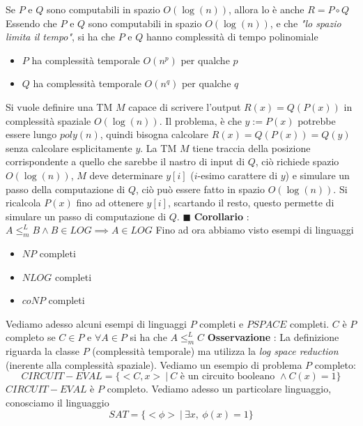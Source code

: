 \documentclass[10pt, letterpaper]{report}
\begin{document}
\teo{} Se $P$ e $Q$ sono computabili in spazio $O(\log(n))$, allora lo è anche $R=P\circ Q$\acc 
\dimo{} Essendo che $P$ e $Q$ sono computabili in spazio $O(\log(n))$, e che \textit{"lo spazio limita il tempo"}, si ha che $P$ e $Q$ hanno complessità di tempo polinomiale\begin{itemize}
    \item $P$ ha complessità temporale $O(n^p)$ per qualche $p$
    \item $Q$ ha complessità temporale $O(n^q)$ per qualche $q$
\end{itemize}
Si vuole definire una TM $M$ capace di scrivere l'output $R(x)=Q(P(x))$ in complessità spaziale $O(\log(n))$.\acc 
Il problema, è che $y:=P(x)$ potrebbe essere lungo $poly(n)$, quindi bisogna calcolare $R(x)=Q(P(x))=Q(y)$ senza calcolare esplicitamente $y$.\acc 
{}\acc 
La TM $M$ tiene traccia della posizione corrispondente a quello che sarebbe il nastro di input di $Q$, ciò richiede spazio $O(\log(n))$, $M$ deve determinare $y[i]$ ($i$-esimo carattere di $y$) e simulare un passo della computazione di $Q$, ciò può essere fatto in spazio $O(\log(n))$. \acc 
Si ricalcola $P(x)$ fino ad ottenere $y[i]$, scartando il resto, questo permette di simulare un passo di computazione di $Q$. \hfill$\blacksquare$\acc 
\textbf{Corollario} : $A\le_m^L B \land B \in LOG \implies A \in LOG$\acc 
Fino ad ora abbiamo visto esempi di linguaggi\begin{itemize}
    \item $NP$ completi
    \item $NLOG$ completi
    \item $coNP$ completi
\end{itemize}
Vediamo adesso alcuni esempi di linguaggi $P$ completi e $PSPACE$ completi.\acc 
{} $C$ è $P$ completo se $C\in P$ e $\forall A\in P$ si ha che $A\le_m^L C$\acc 
\textbf{Osservazione} : La definizione riguarda la classe $P$ (complessità temporale) ma utilizza la \textit{log space reduction} (inerente alla complessità spaziale).
Vediamo un esempio di problema $P$ completo: 
$$ CIRCUIT-EVAL=\{<C,x> \ | \ C\text{ è un circuito booleano }\land C(x)=1\}$$
\teo{} $CIRCUIT-EVAL$ è $P$ completo.\acc 
Vediamo adesso un particolare linguaggio, conosciamo il linguaggio $$ SAT=\{<\phi>\ | \ \exists x,\ \phi(x)=1 \}$$
\end{document}
